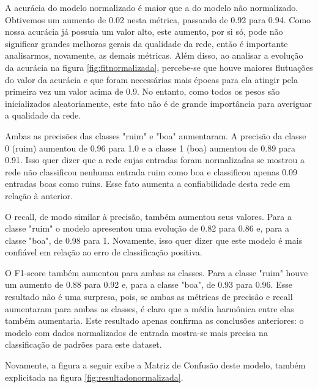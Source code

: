 \documentclass[12pt]{article}
\begin{document}
A acurácia do modelo normalizado é maior que a do modelo não normalizado. Obtivemos um aumento de 0.02 nesta métrica, passando de 0.92 para 0.94. Como nossa acurácia já possuía um valor alto, este aumento, por si só, pode não significar grandes melhoras gerais da qualidade da rede, então é importante analisarmos, novamente, as demais métricas. Além disso, ao analisar a evolução da acurácia na figura \ref{fig:fitnormalizada}, percebe-se que houve maiores flutuações do valor da acurácia e que foram necessárias mais épocas para ela atingir pela primeira vez um valor acima de 0.9. No entanto, como todos os pesos são inicializados aleatoriamente, este fato não é de grande importância para averiguar a qualidade da rede.

Ambas as precisões das classes "ruim" e "boa" aumentaram. A precisão da classe 0 (ruim) aumentou de 0.96 para 1.0 e a classe 1 (boa) aumentou de 0.89 para 0.91. Isso quer dizer que a rede cujas entradas foram normalizadas se mostrou a rede não classificou nenhuma entrada ruim como boa e classificou apenas 0.09 entradas boas como ruins. Esse fato aumenta a confiabilidade desta rede em relação à anterior.

O recall, de modo similar à precisão, também aumentou seus valores. Para a classe "ruim" o modelo apresentou uma evolução de 0.82 para 0.86 e, para a classe "boa", de 0.98 para 1. Novamente, isso quer dizer que este modelo é mais confiável em relação ao erro de classificação positiva.

O F1-score também aumentou para ambas as classes. Para a classe "ruim" houve um aumento de 0.88 para 0.92 e, para a classe "boa", de 0.93 para 0.96. Esse resultado não é uma surpresa, pois, se ambas as métricas de precisão e recall aumentaram para ambas as classes, é claro que a média harmônica entre elas também aumentaria. Este resultado apenas confirma as conclusões anteriores: o modelo com dados normalizados de entrada mostra-se mais precisa na classificação de padrões para este dataset.

Novamente, a figura a seguir exibe a Matriz de Confusão deste modelo, também explicitada na figura \ref{fig:resultadonormalizada}.
\end{document}
